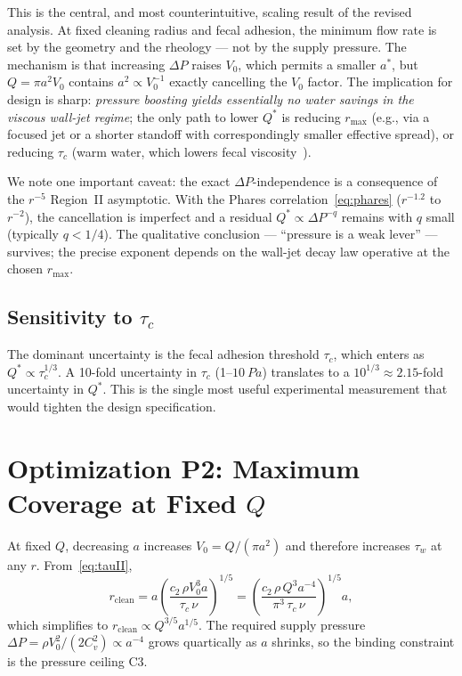 \documentclass[aps,prfluids,reprint,amsmath,amssymb,floatfix]{revtex4-2}
\begin{document}
This is the central, and most counterintuitive, scaling result of the
revised analysis. At fixed cleaning radius and fecal adhesion, the minimum
flow rate is set by the geometry and the rheology --- not by the supply
pressure. The mechanism is that increasing $\Delta P$ raises $V_0$, which
permits a smaller $a^*$, but $Q = \pi a^2 V_0$ contains $a^2 \propto V_0^{-1}$
exactly cancelling the $V_0$ factor. The implication for design is sharp:
\emph{pressure boosting yields essentially no water savings in the
viscous wall-jet regime}; the only path to lower $Q^*$ is reducing
$r_\mathrm{max}$ (e.g., via a focused jet or a shorter standoff with
correspondingly smaller effective spread), or reducing $\tau_c$ (warm
water, which lowers fecal viscosity~\citep{Woolley2014}).

We note one important caveat: the exact $\Delta P$-independence is a
consequence of the $r^{-5}$ Region~II asymptotic. With the Phares
correlation~\eqref{eq:phares} ($r^{-1.2}$ to $r^{-2}$), the cancellation
is imperfect and a residual $Q^* \propto \Delta P^{-q}$ remains with
$q$ small (typically $q < 1/4$). The qualitative conclusion ---
``pressure is a weak lever'' --- survives; the precise exponent depends
on the wall-jet decay law operative at the chosen $r_\mathrm{max}$.

\subsection{Sensitivity to $\tau_c$}

The dominant uncertainty is the fecal adhesion threshold $\tau_c$, which
enters as $Q^* \propto \tau_c^{1/3}$. A 10-fold uncertainty in $\tau_c$
(1--$\SI{10}{Pa}$) translates to a $10^{1/3} \approx 2.15$-fold uncertainty
in $Q^*$. This is the single most useful experimental measurement that
would tighten the design specification.

\section{Optimization P2: Maximum Coverage at Fixed $Q$}
\label{sec:P2}

At fixed $Q$, decreasing $a$ increases $V_0 = Q/(\pi a^2)$ and therefore
increases $\tau_w$ at any $r$. From~\eqref{eq:tauII},
\begin{equation}
  r_\mathrm{clean} = a\left(\frac{c_2\,\rho V_0^3 a}{\tau_c\,\nu}\right)^{1/5}
  = \left(\frac{c_2\,\rho\,Q^3 a^{-4}}{\pi^3\,\tau_c\,\nu}\right)^{1/5} a,
  \label{eq:rcleanQ}
\end{equation}
which simplifies to $r_\mathrm{clean} \propto Q^{3/5} a^{1/5}$. The
required supply pressure $\Delta P = \rho V_0^2/(2 C_v^2) \propto a^{-4}$
grows quartically as $a$ shrinks, so the binding constraint is the
pressure ceiling C3.
\end{document}
